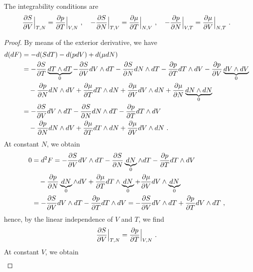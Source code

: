     The integrability conditions are 
    \begin{equation}\label{td:int:f}
        \frac{\partial S}{\partial V} \Big \vert_{T,N} = \frac{\partial p}{\partial T} \Big \vert_{V,N} ~, \quad 
        - \frac{\partial S}{\partial N} \Big \vert_{T,V} = \frac{\partial\mu}{\partial T} \Big \vert_{N, V} ~, \quad 
        - \frac{\partial p}{\partial N} \Big \vert_{V,T} = \frac{\partial\mu}{\partial V} \Big \vert_{N, T} ~. 
    \end{equation}
    \begin{proof}
        By means of the exterior derivative, we have 
        \begin{equation*}
        \begin{aligned}
            d (dF) & = - d (S dT) - d (p dV) + d (\mu dN) \\ & = - \frac{\partial S}{\partial T} \underbrace{dT \wedge dT}_0 - \frac{\partial S}{\partial V} dV \wedge dT - \frac{\partial S}{\partial N} dN \wedge dT - \frac{\partial p}{\partial T} dT \wedge dV - \frac{\partial p}{\partial V} \underbrace{dV \wedge dV}_0 \\ & \quad - \frac{\partial p}{\partial N} dN \wedge dV + \frac{\partial\mu}{\partial T} dT \wedge dN + \frac{\partial\mu}{\partial V} dV \wedge dN + \frac{\partial\mu}{\partial N} \underbrace{dN \wedge dN}_0 \\ & = - \frac{\partial S}{\partial V} dV \wedge dT - \frac{\partial S}{\partial N} dN \wedge dT - \frac{\partial p}{\partial T} dT \wedge dV \\ & \quad - \frac{\partial p}{\partial N} dN \wedge dV + \frac{\partial\mu}{\partial T} dT \wedge dN + \frac{\partial\mu}{\partial V} dV \wedge dN ~.
        \end{aligned}
        \end{equation*}
        At constant $N$, we obtain 
        \begin{equation*}
        \begin{aligned}
            0 & = d^2 F = - \frac{\partial S}{\partial V} dV \wedge dT - \frac{\partial S}{\partial N} \underbrace{dN}_0 \wedge dT - \frac{\partial p}{\partial T} dT \wedge dV \\ & \quad - \frac{\partial p}{\partial N} \underbrace{dN}_0 \wedge dV + \frac{\partial\mu}{\partial T} dT \wedge \underbrace{dN}_0 + \frac{\partial\mu}{\partial V} dV \wedge \underbrace{dN}_0 \\ & = - \frac{\partial S}{\partial V} dV \wedge dT - \frac{\partial p}{\partial T} dT \wedge dV = - \frac{\partial S}{\partial V} dV \wedge dT + \frac{\partial p}{\partial T} dV \wedge dT  ~,
        \end{aligned}
        \end{equation*}
        hence, by the linear independence of $V$ and $T$, we find
        \begin{equation*}
            \frac{\partial S}{\partial V} \Big \vert_{T,N} = \frac{\partial p}{\partial T} \Big \vert_{V,N} ~.
        \end{equation*}
        At constant $V$, we obtain
        \begin{equation*}
        \begin{aligned}

\end{aligned}
\end{equation*}
\end{proof}
